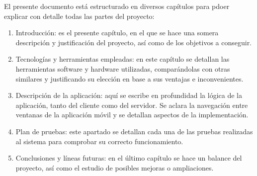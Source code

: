 El presente documento está estructurado en diversos capítulos para pdoer explicar con detalle todas las partes del proyecto:

\begin{enumerate}
	\item Introducción: es el presente capítulo, en el que se hace una somera descripción y justificación del proyecto, así como de los objetivos a conseguir.
	\item Tecnologías y herramientas empleadas: en este capítulo se detallan las herramientas software y hardware utilizadas, comparándolas con otras similares y justificando su elección en base a sus ventajas e inconvenientes.
	\item Descripción de la aplicación: aquí se escribe en profundidad la lógica de la aplicación, tanto del cliente como del servidor. Se aclara la navegación entre ventanas de la aplicación móvil y se detallan aspectos de la implementación.
	\item Plan de pruebas: este apartado se detallan cada una de las pruebas realizadas al sistema para comprobar su correcto funcionamiento.
	\item Conclusiones y líneas futuras: en el último capítulo se hace un balance del proyecto, así como el estudio de posibles mejoras o ampliaciones.
\end{enumerate}

\chapterend